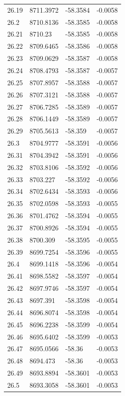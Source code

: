 \begin{table}[H]
\begin{tabular}{llll}
26.19 & 8711.3972 & -58.3584 & -0.0058 \\
26.2 & 8710.8136 & -58.3585 & -0.0058 \\
26.21 & 8710.23 & -58.3585 & -0.0058 \\
26.22 & 8709.6465 & -58.3586 & -0.0058 \\
26.23 & 8709.0629 & -58.3587 & -0.0058 \\
26.24 & 8708.4793 & -58.3587 & -0.0057 \\
26.25 & 8707.8957 & -58.3588 & -0.0057 \\
26.26 & 8707.3121 & -58.3588 & -0.0057 \\
26.27 & 8706.7285 & -58.3589 & -0.0057 \\
26.28 & 8706.1449 & -58.3589 & -0.0057 \\
26.29 & 8705.5613 & -58.359 & -0.0057 \\
26.3 & 8704.9777 & -58.3591 & -0.0056 \\
26.31 & 8704.3942 & -58.3591 & -0.0056 \\
26.32 & 8703.8106 & -58.3592 & -0.0056 \\
26.33 & 8703.227 & -58.3592 & -0.0056 \\
26.34 & 8702.6434 & -58.3593 & -0.0056 \\
26.35 & 8702.0598 & -58.3593 & -0.0055 \\
26.36 & 8701.4762 & -58.3594 & -0.0055 \\
26.37 & 8700.8926 & -58.3594 & -0.0055 \\
26.38 & 8700.309 & -58.3595 & -0.0055 \\
26.39 & 8699.7254 & -58.3596 & -0.0055 \\
26.4 & 8699.1418 & -58.3596 & -0.0054 \\
26.41 & 8698.5582 & -58.3597 & -0.0054 \\
26.42 & 8697.9746 & -58.3597 & -0.0054 \\
26.43 & 8697.391 & -58.3598 & -0.0054 \\
26.44 & 8696.8074 & -58.3598 & -0.0054 \\
26.45 & 8696.2238 & -58.3599 & -0.0054 \\
26.46 & 8695.6402 & -58.3599 & -0.0053 \\
26.47 & 8695.0566 & -58.36 & -0.0053 \\
26.48 & 8694.473 & -58.36 & -0.0053 \\
26.49 & 8693.8894 & -58.3601 & -0.0053 \\
26.5 & 8693.3058 & -58.3601 & -0.0053 \\

\end{tabular}
\end{table}
